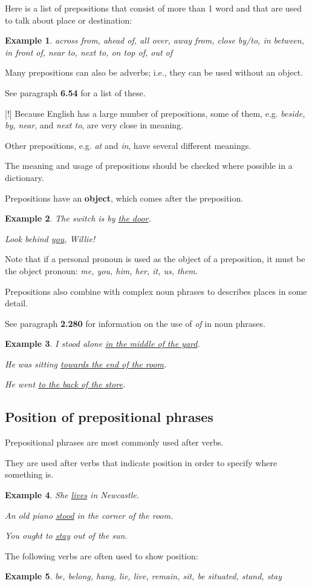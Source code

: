 \documentclass[oneside]{book}
\numberwithin{equation}{section}
\newtheorem{example}{Example}[section]
\begin{document}
%
Here is a list of prepositions that consist of more than 1 word and that are used to talk about place or destination:
\begin{example}
    across from, ahead of, all over, away from, close by/to, in between, in front of, near to, next to, on top of, out of
\end{example}
%
\noindent{} Many prepositions can also be adverbs; i.e., they can be used without an object.

See paragraph \textbf{6.54} for a list of these.

%
\noindent{} [!] Because English has a large number of prepositions, some of them, e.g. \textit{beside, by, near}, and \textit{next to}, are very close in meaning.

Other prepositions, e.g. \textit{at} and \textit{in}, have several different meanings.

The meaning and usage of prepositions should be checked where possible in a dictionary.

%
\noindent{} Prepositions have an \textbf{object}, which comes after the preposition.
\begin{example}
    The switch is by \underline{the door}.
    
    Look behind \underline{you}, Willie!
\end{example}
Note that if a personal pronoun is used as the object of a preposition, it must be the object pronoun: \textit{me, you, him, her, it, us, them}.

%
Prepositions also combine with complex noun phrases to describes places in some detail.

See paragraph \textbf{2.280} for information on the use of \textit{of} in noun phrases.
\begin{example}
    I stood alone \underline{in the middle of the yard}.
    
    He was sitting \underline{towards the end of the room}.
    
    He went \underline{to the back of the store}.
\end{example}

\subsection{Position of prepositional phrases}
\noindent{} Prepositional phrases are most commonly used after verbs.

They are used after verbs that indicate position in order to specify where something is.
\begin{example}
    She \underline{lives} in Newcastle.
    
    An old piano \underline{stood} in the corner of the room.
    
    You ought to \underline{stay} out of the sun.
\end{example}
The following verbs are often used to show position:
\begin{example}
    be, belong, hang, lie, live, remain, sit, be situated, stand, stay
\end{example}
\end{document}
